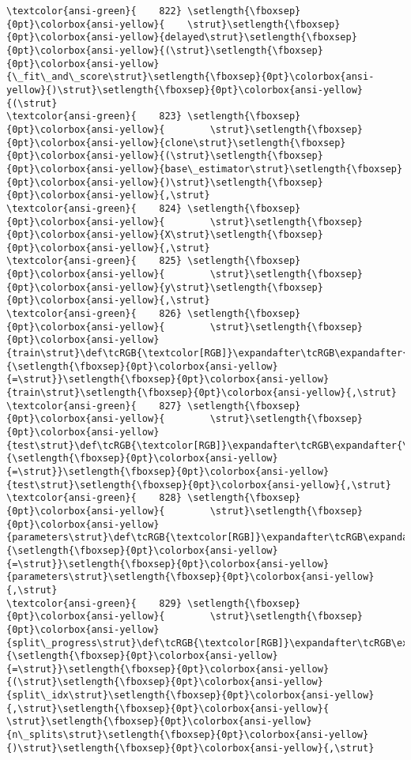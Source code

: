 \documentclass[11pt]{article}
\begin{document}
\begin{Verbatim}[commandchars=\\\{\}, frame=single, framerule=2mm, rulecolor=\color{outerrorbackground}]
\textcolor{ansi-green}{    822} \setlength{\fboxsep}{0pt}\colorbox{ansi-yellow}{    \strut}\setlength{\fboxsep}{0pt}\colorbox{ansi-yellow}{delayed\strut}\setlength{\fboxsep}{0pt}\colorbox{ansi-yellow}{(\strut}\setlength{\fboxsep}{0pt}\colorbox{ansi-yellow}{\_fit\_and\_score\strut}\setlength{\fboxsep}{0pt}\colorbox{ansi-yellow}{)\strut}\setlength{\fboxsep}{0pt}\colorbox{ansi-yellow}{(\strut}
\textcolor{ansi-green}{    823} \setlength{\fboxsep}{0pt}\colorbox{ansi-yellow}{        \strut}\setlength{\fboxsep}{0pt}\colorbox{ansi-yellow}{clone\strut}\setlength{\fboxsep}{0pt}\colorbox{ansi-yellow}{(\strut}\setlength{\fboxsep}{0pt}\colorbox{ansi-yellow}{base\_estimator\strut}\setlength{\fboxsep}{0pt}\colorbox{ansi-yellow}{)\strut}\setlength{\fboxsep}{0pt}\colorbox{ansi-yellow}{,\strut}
\textcolor{ansi-green}{    824} \setlength{\fboxsep}{0pt}\colorbox{ansi-yellow}{        \strut}\setlength{\fboxsep}{0pt}\colorbox{ansi-yellow}{X\strut}\setlength{\fboxsep}{0pt}\colorbox{ansi-yellow}{,\strut}
\textcolor{ansi-green}{    825} \setlength{\fboxsep}{0pt}\colorbox{ansi-yellow}{        \strut}\setlength{\fboxsep}{0pt}\colorbox{ansi-yellow}{y\strut}\setlength{\fboxsep}{0pt}\colorbox{ansi-yellow}{,\strut}
\textcolor{ansi-green}{    826} \setlength{\fboxsep}{0pt}\colorbox{ansi-yellow}{        \strut}\setlength{\fboxsep}{0pt}\colorbox{ansi-yellow}{train\strut}\def\tcRGB{\textcolor[RGB]}\expandafter\tcRGB\expandafter{\detokenize{98,98,98}}{\setlength{\fboxsep}{0pt}\colorbox{ansi-yellow}{=\strut}}\setlength{\fboxsep}{0pt}\colorbox{ansi-yellow}{train\strut}\setlength{\fboxsep}{0pt}\colorbox{ansi-yellow}{,\strut}
\textcolor{ansi-green}{    827} \setlength{\fboxsep}{0pt}\colorbox{ansi-yellow}{        \strut}\setlength{\fboxsep}{0pt}\colorbox{ansi-yellow}{test\strut}\def\tcRGB{\textcolor[RGB]}\expandafter\tcRGB\expandafter{\detokenize{98,98,98}}{\setlength{\fboxsep}{0pt}\colorbox{ansi-yellow}{=\strut}}\setlength{\fboxsep}{0pt}\colorbox{ansi-yellow}{test\strut}\setlength{\fboxsep}{0pt}\colorbox{ansi-yellow}{,\strut}
\textcolor{ansi-green}{    828} \setlength{\fboxsep}{0pt}\colorbox{ansi-yellow}{        \strut}\setlength{\fboxsep}{0pt}\colorbox{ansi-yellow}{parameters\strut}\def\tcRGB{\textcolor[RGB]}\expandafter\tcRGB\expandafter{\detokenize{98,98,98}}{\setlength{\fboxsep}{0pt}\colorbox{ansi-yellow}{=\strut}}\setlength{\fboxsep}{0pt}\colorbox{ansi-yellow}{parameters\strut}\setlength{\fboxsep}{0pt}\colorbox{ansi-yellow}{,\strut}
\textcolor{ansi-green}{    829} \setlength{\fboxsep}{0pt}\colorbox{ansi-yellow}{        \strut}\setlength{\fboxsep}{0pt}\colorbox{ansi-yellow}{split\_progress\strut}\def\tcRGB{\textcolor[RGB]}\expandafter\tcRGB\expandafter{\detokenize{98,98,98}}{\setlength{\fboxsep}{0pt}\colorbox{ansi-yellow}{=\strut}}\setlength{\fboxsep}{0pt}\colorbox{ansi-yellow}{(\strut}\setlength{\fboxsep}{0pt}\colorbox{ansi-yellow}{split\_idx\strut}\setlength{\fboxsep}{0pt}\colorbox{ansi-yellow}{,\strut}\setlength{\fboxsep}{0pt}\colorbox{ansi-yellow}{ \strut}\setlength{\fboxsep}{0pt}\colorbox{ansi-yellow}{n\_splits\strut}\setlength{\fboxsep}{0pt}\colorbox{ansi-yellow}{)\strut}\setlength{\fboxsep}{0pt}\colorbox{ansi-yellow}{,\strut}

\end{Verbatim}
\end{document}
